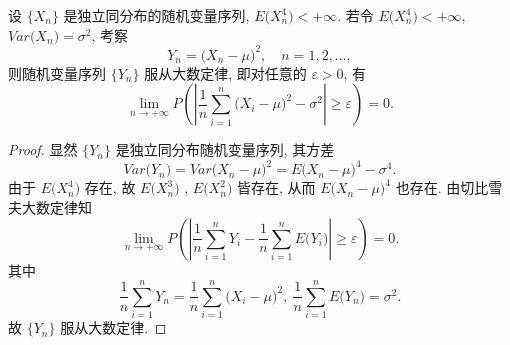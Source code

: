 \begin{example}\label{exam:4.2.2}
    设 $ \{ X_n \} $ 是独立同分布的随机变量序列, $ E \bigl( X_n^4 \bigr) < +\infty $. 若令 $ E \bigl( X_n^4 \bigr) < +\infty $, $ Var \bigl( X_n \bigr)= \sigma^2 $, 考察
    \begin{equation*}
        Y_n = \bigl( X_n - \mu \bigr)^2, \quad n = 1, 2, \dotsc,
    \end{equation*}
    则随机变量序列 $ \{ Y_n \} $ 服从大数定律, 即对任意的 $ \varepsilon > 0 $, 有
    \begin{equation*}
        \lim_{n \to +\infty} P \left( \left\lvert \frac{1}{n} \sum_{i=1}^n \bigl( X_i - \mu \bigr)^2 - \sigma^2 \right\rvert \geq \varepsilon \right) = 0.
    \end{equation*}
\end{example}

\begin{proof}
    显然 $ \{ Y_n \} $ 是独立同分布随机变量序列, 其方差
    \begin{equation*}
        Var \bigl( Y_n \bigr) = Var \bigl( X_n - \mu \bigr)^2 = E \bigl( X_n - \mu \bigr)^4 - \sigma^4.
    \end{equation*}
    由于 $ E \bigl( X_n^4 \bigr) $ 存在, 故 $ E \bigl( X_n^3 \bigr) $ ,  $ E \bigl( X_n^2 \bigr) $ 皆存在, 从而 $ E \bigl( X_n - \mu \bigr)^4 $ 也存在.
    由切比雪夫大数定律知
    \begin{equation*}
        \lim_{n \to +\infty} P \left( \left\lvert \frac{1}{n} \sum_{i=1}^n Y_i - \frac{1}{n} \sum_{i=1}^n E \bigl( Y_i \bigr) \right\rvert \geq \varepsilon \right) = 0.
    \end{equation*}
    其中
    \begin{equation*}
        \frac{1}{n} \sum_{i=1}^n Y_n = \frac{1}{n} \sum_{i=1}^n \bigl( X_i - \mu \bigr)^2, \ \frac{1}{n} \sum_{i=1}^n E \bigl( Y_n \bigr) = \sigma^2.
    \end{equation*}
    故 $ \{ Y_n \} $ 服从大数定律.
\end{proof}
